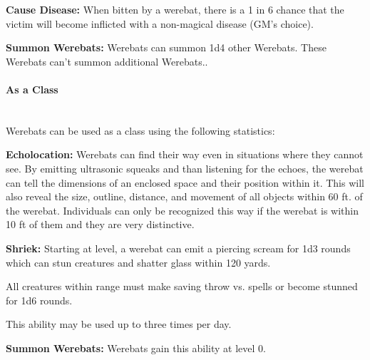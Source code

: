 \begin{multicols*}{2}
\textbf{Cause Disease:} When bitten by a werebat, there is a 1 in 6 chance that the victim will become inflicted with a non-magical disease (GM's choice).

\textbf{Summon Werebats:} Werebats can summon 1d4 other Werebats. These Werebats can't summon additional Werebats..

\paragraph{As a Class}\mbox{}\\
Werebats can be used as a class using the following statistics:

\textbf{Echolocation:} Werebats can find their way even in situations where they cannot see. By emitting ultrasonic squeaks and than listening for the echoes, the werebat can tell the dimensions of an enclosed space and their position within it. This will also reveal the size, outline, distance, and movement of all objects within 60 ft. of the werebat. Individuals can only be recognized this way if the werebat is within 10 ft of them and they are very distinctive.

\textbf{Shriek:} Starting at  level, a werebat can emit a piercing scream for 1d3 rounds which can stun creatures and shatter glass within 120 yards.

All creatures within range must make saving throw vs. spells or become stunned for 1d6 rounds.

This ability may be used up to three times per day.

\textbf{Summon Werebats:} Werebats gain this ability at level 0.



\end{multicols*}
